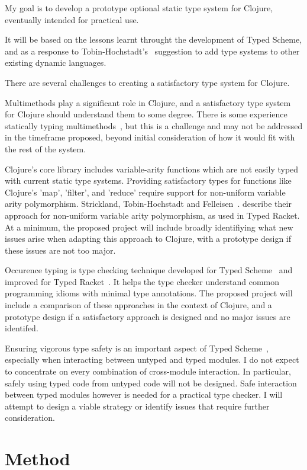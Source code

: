My goal is to develop a prototype optional static type system for Clojure, 
eventually intended for practical use.

It will be based on the lessons learnt throught the development
of Typed Scheme, and as a response to Tobin-Hochstadt's~\cite{Tob10}
suggestion to add type systems to other existing dynamic languages.

There are several challenges to creating a satisfactory type system for Clojure.

Multimethods play a significant role in Clojure, and a satisfactory
type system for Clojure should understand them to some degree.
There is some experience statically typing multimethods~\cite{MS02}, 
but this is a challenge and may not be addressed in the
timeframe proposed, beyond initial consideration of how it would
fit with the rest of the system.

Clojure's core library includes variable-arity functions which
are not easily typed with current static type systems. 
Providing satisfactory types for functions 
like Clojure's 'map', 'filter', and 'reduce' require
support for non-uniform variable arity polymorphism. 
Strickland, Tobin-Hochstadt and Felleisen~\cite{STF09}.
describe their approach for non-uniform variable arity polymorphism, as used
in Typed Racket. 
At a minimum, the proposed project will include broadly identifiying 
what new issues arise when adapting this approach to Clojure, 
with a prototype design if these issues are not too major.

Occurence typing is type checking technique developed for Typed Scheme~\cite{TF08}
and improved for Typed Racket~\cite{TF10}.
It helps the type checker understand common programming idioms 
with minimal type annotations.
The proposed project will include a comparison of these approaches in
the context of Clojure, and a prototype design if a satisfactory approach 
is designed and no major issues are identifed.

Ensuring vigorous type safety is an important aspect of Typed Scheme~\cite{Tob10},
especially when interacting between untyped and typed modules.
I do not expect to concentrate on every combination of cross-module
interaction. In particular, safely using typed code from untyped code
will not be designed. Safe interaction between typed modules
however is needed for a practical type checker. I
will attempt to design a viable strategy or identify issues that
require further consideration.

\section*{Method}

